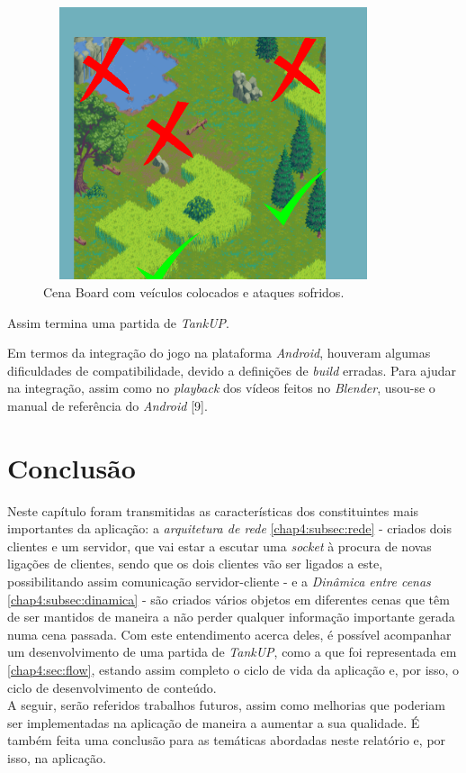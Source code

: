 \begin{figure}[!h]
    \includegraphics[width=10cm, height=8cm]{screen8.png}
    \centering
    \caption{Cena Board com veículos colocados e ataques sofridos.}
    \label{fig:screen8}
\end{figure}
    
\clearpage
Assim termina uma partida de \emph{TankUP}.

Em termos da integração do jogo na plataforma \emph{Android}, houveram algumas dificuldades de compatibilidade, devido a definições de \textit{build} erradas. Para ajudar na integração, assim como no \textit{playback} dos vídeos feitos no \emph{Blender}, usou-se o manual de referência do \emph{Android} [9].

\section{Conclusão}
\label{chap4:sec:conc}
Neste capítulo foram transmitidas as características dos constituintes mais importantes da aplicação: a \emph{arquitetura de rede} \autoref{chap4:subsec:rede} - criados dois clientes e um servidor, que vai estar a escutar uma \textit{socket} à procura de novas ligações de clientes, sendo que os dois clientes vão ser ligados a este, possibilitando assim comunicação servidor-cliente - e a \emph{Dinâmica entre cenas} \autoref{chap4:subsec:dinamica} - são criados vários objetos em diferentes cenas que têm de ser mantidos de maneira a não perder qualquer informação importante gerada numa cena passada. Com este entendimento acerca deles, é possível acompanhar um desenvolvimento de uma partida de \emph{TankUP}, como a que foi representada em \autoref{chap4:sec:flow}, estando assim completo o ciclo de vida da aplicação e, por isso, o ciclo de desenvolvimento de conteúdo. \\

A seguir, serão referidos trabalhos futuros, assim como melhorias que poderiam ser implementadas na aplicação de maneira a aumentar a sua qualidade. É também feita uma conclusão para as temáticas abordadas neste relatório e, por isso, na aplicação.